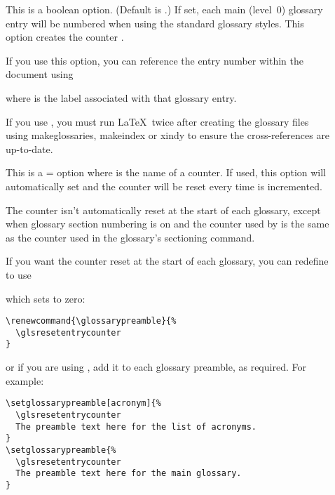 \documentclass[report,inlinetitle]{nlctdoc}
\renewcommand*{\glossarypreamble}{%
\emph{This glossary style was setup using:}
\begin{ttfamily}
\begin{tabbing}
\cs{usepackage}[\=xindy,\\
\+\>nonumberlist,\\
  toc,\\
  nopostdot,\\
  style=altlist,\\
  nogroupskip]\{glossaries\}
\end{tabbing}
\end{ttfamily}
}
\begin{document}
\begin{description}
\item[] This is a boolean option. (Default
is .) If set, each main (level~0)
glossary entry will be numbered when using the standard glossary
styles. This option creates the counter
.

If you use this option, you can reference the entry number
within the document using
\begin{definition}[\DescribeMacro{\glsrefentry}]
\end{definition}
where  is the label associated with that glossary entry.

\begin{important}
If you use , you must run \LaTeX\ twice after
creating the glossary files using \gls{makeglossaries},
\gls{makeindex} or \gls{xindy} to ensure the cross-references are
up-to-date.
\end{important}

\item[] This is a =
option where  is the name of a counter. If used, this
option will automatically set  and the
 counter will be reset every time  is
incremented.


\begin{important}
The  counter isn't automatically reset at the
start of each glossary, except when glossary section numbering is on
and the counter used by  is the same as the
counter used in the glossary's sectioning command.
\end{important}

If you want the counter reset at the start of each glossary, you can
redefine  to use
\begin{definition}[\DescribeMacro{\glsresetentrycounter}]
\end{definition}
which sets  to zero:
\begin{verbatim}
\renewcommand{\glossarypreamble}{%
  \glsresetentrycounter
}
\end{verbatim}
or if you are using , add it to each
glossary preamble, as required. For example:
\begin{verbatim}
\setglossarypreamble[acronym]{%
  \glsresetentrycounter
  The preamble text here for the list of acronyms.
}
\setglossarypreamble{%
  \glsresetentrycounter
  The preamble text here for the main glossary.
}
\end{verbatim}


\end{description}
\end{document}
